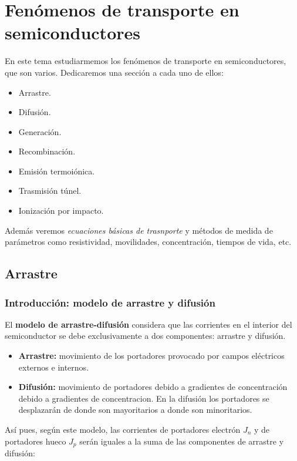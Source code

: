 \chapter{Fenómenos de transporte en semiconductores}



En este tema estudiarmemos los fenómenos de transporte en semiconductores, que son varios. Dedicaremos una sección a cada uno de ellos:

\begin{itemize}
	\item Arrastre.
	\item Difusión.
	\item Generación.
	\item Recombinación.
	\item Emisión termoiónica.
	\item Trasmisión túnel.
	\item Ionización por impacto.
\end{itemize}
Además veremos \textit{ecuaciones básicas de trasnporte} y métodos de medida de parámetros como resistividad, movilidades, concentración, tiempos de vida, etc.



\section{Arrastre}

\subsection{Introducción: modelo de arrastre y difusión}

El \textbf{modelo de arrastre-difusión} considera que las corrientes en el interior del semiconductor se debe exclusivamente a dos componentes: arrastre y difusión.

\begin{itemize}
	\item \textbf{Arrastre:} movimiento de los portadores provocado por campos eléctricos externos e internos.
	\item \textbf{Difusión:} movimiento de portadores debido a gradientes de concentración debido a gradientes de concentracion. En la difusión los portadores se desplazarán de donde son mayoritarios a donde son minoritarios.
\end{itemize}
Así pues, según este modelo, las corrientes de portadores electrón $J_n$ y de portadores hueco $J_p$ serán iguales a la suma de las componentes de arrastre y difusión:

